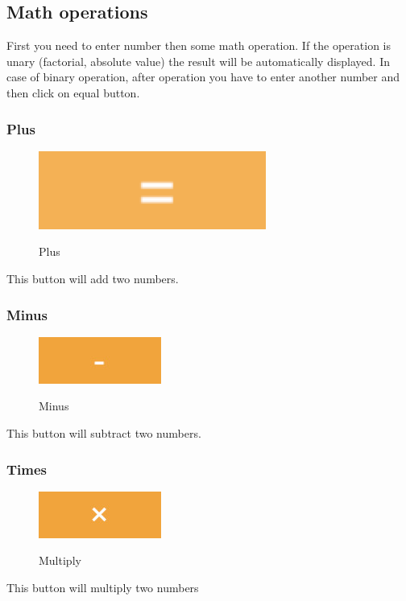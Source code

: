 \documentclass[11pt, a4paper]{article}
\begin{document}
    \subsection{Math operations}
    \label{subsec:mathOperations}
        First you need to enter number then some math operation. If the operation is unary (factorial, absolute value) the result will be automatically displayed. In case of binary operation, after operation you have to enter another number and then click on equal button.
    \subsubsection{Plus}
    \label{subsubsec:plus}
        \begin{figure}[h]
            \caption{Plus}
            \includegraphics[scale = 0.2]{plus}
            \centering
            \label{fig:plus}
        \end{figure}
        This button will add two numbers.
    \subsubsection{Minus}
    \label{subsubsec:minus}
        \begin{figure}[hbt!]
            \caption{Minus}
            \includegraphics[scale = 0.2]{minus}
            \centering
            \label{fig:minus}
        \end{figure}
        This button will subtract two numbers.
    \subsubsection{Times}
    \label{subsubsec:times}
        \begin{figure}[hbt!]
            \caption{Multiply}
            \includegraphics[scale = 0.2]{multiply}
            \centering
            \label{fig:mul}
        \end{figure}
        This button will multiply two numbers
\end{document}
